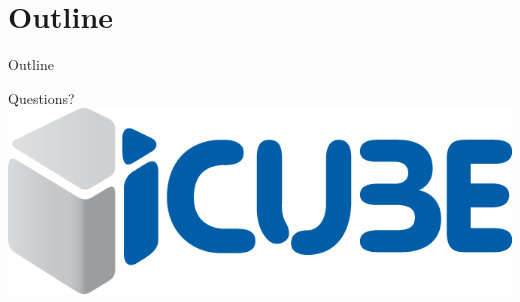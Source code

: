 %
%





\begin {frame} [plain]
    \titlepage
\end {frame}

\section* {Outline}

\begin {frame} {Outline}
    \tableofcontents
\end {frame}






\begin {frame} {Questions?}
    \includegraphics [width=\textwidth,keepaspectratio] {img/icube}
\end {frame}



